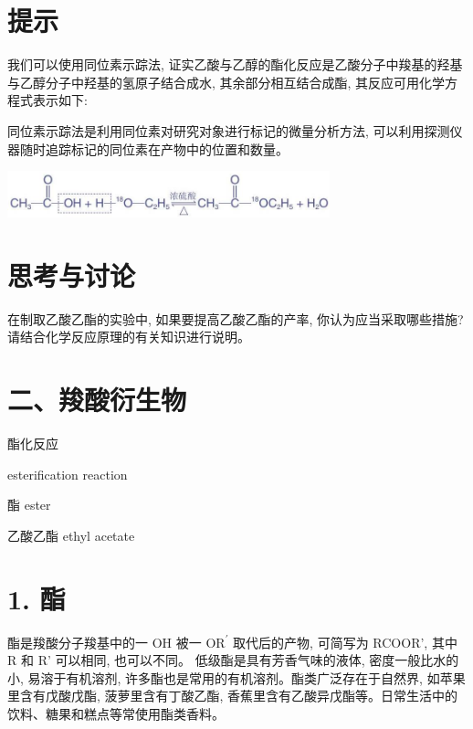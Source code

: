 \documentclass[10pt]{article}
\begin{document}
\section*{提示}

我们可以使用同位素示踪法, 证实乙酸与乙醇的酯化反应是乙酸分子中羧基的羟基与乙醇分子中羟基的氢原子结合成水, 其余部分相互结合成酯, 其反应可用化学方程式表示如下:

\begin{mdframed}

同位素示踪法是利用同位素对研究对象进行标记的微量分析方法, 可以利用探测仪器随时追踪标记的同位素在产物中的位置和数量。

\end{mdframed}

\begin{center}
\includegraphics[max width=0.7\textwidth]{images/0190efc5-b58a-7c43-bfb0-e0a030df9cfd_81_291005.jpg}
\end{center}

\section*{思考与讨论}

在制取乙酸乙酯的实验中, 如果要提高乙酸乙酯的产率, 你认为应当采取哪些措施? 请结合化学反应原理的有关知识进行说明。

\section*{二、羧酸衍生物}

\begin{mdframed}

酯化反应

esterification reaction

酯 ester

乙酸乙酯 ethyl acetate

\end{mdframed}

\section*{1. 酯}

酯是羧酸分子羧基中的一 \(\mathrm{{OH}}\) 被一 \({\mathrm{{OR}}}^{\prime }\) 取代后的产物, 可简写为 RCOOR', 其中 R 和 R' 可以相同, 也可以不同。 低级酯是具有芳香气味的液体, 密度一般比水的小, 易溶于有机溶剂, 许多酯也是常用的有机溶剂。酯类广泛存在于自然界, 如苹果里含有戊酸戊酯, 菠萝里含有丁酸乙酯, 香蕉里含有乙酸异戊酯等。日常生活中的饮料、糖果和糕点等常使用酯类香料。
\end{document}
